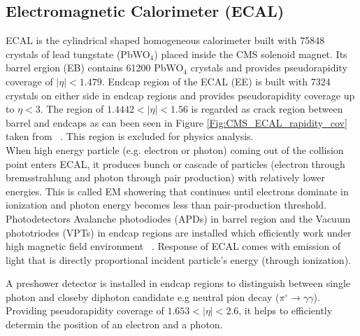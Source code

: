 \subsection{Electromagnetic Calorimeter (ECAL) } \label{cms:ecal}
ECAL is the cylindrical shaped homogeneous calorimeter built with 75848 crystals of lead tungstate (PbWO${}_4$) placed inside the CMS solenoid magnet. Its barrel ergion (EB) contains 61200 PbWO${}_4$ crystals and provides pseudorapidity coverage of $|\eta| < 1.479$. Endcap region of the ECAL
(EE) is built with 7324 crystals on either side in endcap regions and provides pseudorapidity coverage up to $\eta < 3$. 
The region of $1.4442 < |\eta| <1.56$ is regarded as crack region between barrel and endcaps as can been seen in Figure \ref{Fig:CMS_ECAL_rapidity_cov} taken from ~\cite{Reference34}. This region is excluded for  physics analysis.\\
When high energy particle (e.g. electron or photon) coming out of the collision point enters ECAL, it produces bunch or cascade of particles (electron through bremsstrahlung and photon through pair production) with relatively lower energies. This is called EM showering that continues until electrons dominate in ionization and photon energy becomes less than pair-production threshold. \\
Photodetectors Avalanche photodiodes (APDs) in barrel region and the Vacuum phototriodes (VPTs) in endcap regions are installed which efficiently work under high magnetic field environment ~\cite{cms:ECALTDR}. Response of ECAL comes with emission of light that is directly proportional incident particle's energy (through ionization).

A preshower detector is installed in endcap regions to distinguish between single photon and closeby diphoton candidate e.g neutral pion decay ($\pi^{\circ} \rightarrow \gamma\gamma $). Providing pseudorapidity coverage of $1.653<|\eta|<2.6$, it helps to efficiently determin the position of an electron and a photon.

